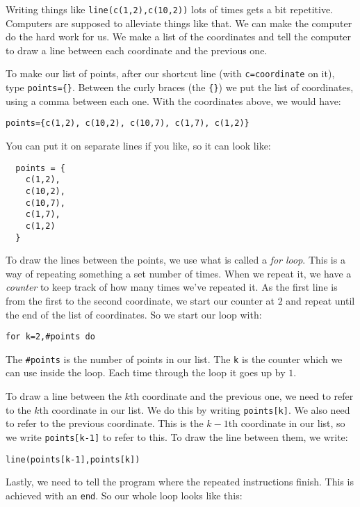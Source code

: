 \documentclass[
  xhtml,%
  text
]{internet}
\begin{document}
Writing things like \verb+line(c(1,2),c(10,2))+ lots of times gets a bit repetitive.
Computers are supposed to alleviate things like that.
We can make the computer do the hard work for us.
We make a list of the coordinates and tell the computer to draw a line between each coordinate and the previous one.

To make our list of points, after our shortcut line (with \verb+c=coordinate+ on it), type \verb+points={}+.
Between the curly braces (the \verb+{}+) we put the list of coordinates, using a comma between each one.
With the coordinates above, we would have:

\begin{verbatim}
points={c(1,2), c(10,2), c(10,7), c(1,7), c(1,2)}
\end{verbatim}

You can put it on separate lines if you like, so it can look like:

\begin{verbatim}
  points = {
    c(1,2),
    c(10,2),
    c(10,7),
    c(1,7),
    c(1,2)
  }
\end{verbatim}

To draw the lines between the points, we use what is called a \emph{for loop}.
This is a way of repeating something a set number of times.
When we repeat it, we have a \emph{counter} to keep track of how many times we've repeated it.
As the first line is from the first to the second coordinate, we start our counter at \(2\) and repeat until the end of the list of coordinates.
So we start our loop with:

\begin{verbatim}
for k=2,#points do
\end{verbatim}

The \verb+#points+ is the number of points in our list.
The \verb+k+ is the counter which we can use inside the loop.
Each time through the loop it goes up by \(1\).

To draw a line between the \(k\)th coordinate and the previous one, we need to refer to the \(k\)th coordinate in our list.
We do this by writing \verb+points[k]+.
We also need to refer to the previous coordinate.
This is the \(k-1\)th coordinate in our list, so we write \verb+points[k-1]+ to refer to this.
To draw the line between them, we write:

\begin{verbatim}
line(points[k-1],points[k])
\end{verbatim}

Lastly, we need to tell the program where the repeated instructions finish.
This is achieved with an \verb+end+.
So our whole loop looks like this:
\end{document}
